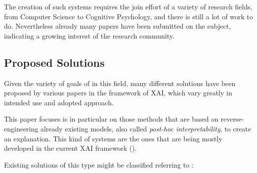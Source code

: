 \documentclass[conference]{IEEEtran}
\begin{document}
The creation of such systems requires the join effort of a variety of research
fields, from Computer Science to Cognitive Psychology, and there is still a lot
of work to do. Nevertheless already many papers have been submitted on the
subject, indicating a growing interest of the research community.

\subsection{Proposed Solutions}
\label{sec:solutions}

Given the variety of goals of in this field, many different solutions
have been proposed by various papers in the framework of XAI, which vary greatly
in intended use and adopted approach.



This paper focuses is in particular on those methods that are based on
reverse-engineering already existing models, also called \textit{post-hoc
    interpretability}, to create an explanation. This kind of systems are the ones
that are being mostly developed in the current XAI framework
(\citet{Giannotti}).

Existing solutions of this type might be classified referring to \citet{nasaxai}:
\end{document}
